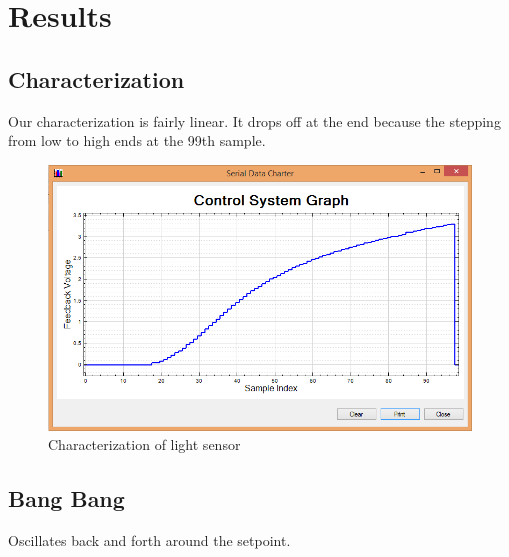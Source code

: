 \documentclass[11pt]{article}
\begin{document}
\section{Results}


\subsection{Characterization}
Our characterization is fairly linear. It drops off at the end because the stepping from low to high ends at the 99th sample.

	\begin{figure}[H]\centering
	\includegraphics[height=0.5\textwidth]{images/characterize.png}
	\caption{Characterization of light sensor}
		\label{characterization}
	\end{figure}

\subsection{Bang Bang}
Oscillates back and forth around the setpoint. 
\end{document}
